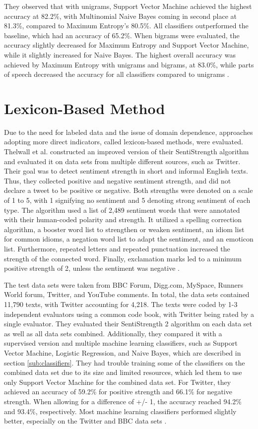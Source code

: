 They observed that with unigrams, Support Vector Machine achieved the highest accuracy at 82.2\%, with Multinomial Naive Bayes coming in second place at 81.3\%, compared to Maximum Entropy's 80.5\%. All classifiers outperformed the baseline, which had an accuracy of 65.2\%. When bigrams were evaluated, the accuracy slightly decreased for Maximum Entropy and Support Vector Machine, while it slightly increased for Naive Bayes. The highest overall accuracy was achieved by Maximum Entropy with unigrams and bigrams, at 83.0\%, while parts of speech decreased the accuracy for all classifiers compared to unigrams \cite{GoBHaHua2009}. 

\section{Lexicon-Based Method}
\label{sub:related_lexicon}

Due to the need for labeled data and the issue of domain dependence, approaches adopting more direct indicators, called lexicon-based methods, were evaluated. Thelwall et al. constructed an improved version of their SentiStrength algorithm and evaluated it on data sets from multiple different sources, such as Twitter. Their goal was to detect sentiment strength in short and informal English texts. Thus, they collected positive and negative sentiment strength, and did not declare a tweet to be positive or negative. Both strengths were denoted on a scale of 1 to 5, with 1 signifying no sentiment and 5 denoting strong sentiment of each type. The algorithm used a list of 2,489 sentiment words that were annotated with their human-coded polarity and strength. It utilized a spelling correction algorithm, a booster word list to strengthen or weaken sentiment, an idiom list for common idioms, a negation word list to adapt the sentiment, and an emoticon list. Furthermore, repeated letters and repeated punctuation increased the strength of the connected word. Finally, exclamation marks led to a minimum positive strength of 2, unless the sentiment was negative \cite{10.1002/asi.21662}.

The test data sets were taken from BBC Forum, Digg.com, MySpace, Runners World forum, Twitter, and YouTube comments. In total, the data sets contained 11,790 texts, with Twitter accounting for 4,218. The texts were coded by 1-3 independent evaluators using a common code book, with Twitter being rated by a single evaluator. They evaluated their SentiStrength 2 algorithm on each data set as well as all data sets combined. Additionally, they compared it with a supervised version and multiple machine learning classifiers, such as Support Vector Machine, Logistic Regression, and Naive Bayes, which are described in section \ref{sub:classifiers}. They had trouble training some of the classifiers on the combined data set due to its size and limited resources, which led them to use only Support Vector Machine for the combined data set. For Twitter, they achieved an accuracy of 59.2\% for positive strength and 66.1\% for negative strength. When allowing for a difference of +/- 1, the accuracy reached 94.2\% and 93.4\%, respectively. Most machine learning classifiers performed slightly better, especially on the Twitter and BBC data sets \cite{10.1002/asi.21662}.

